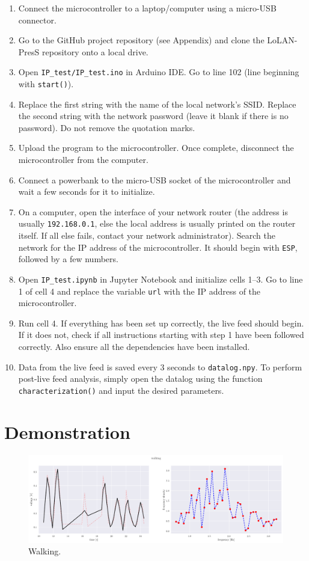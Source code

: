 \documentclass[12pt,a4paper,twoside]{article}
\begin{document}
\begin{enumerate}
    \item Connect the microcontroller to a laptop/computer using a micro-USB connector.
    \item Go to the GitHub project repository (see Appendix) and clone the LoLAN-PresS repository onto a local drive.
    \item Open \texttt{IP\_test/IP\_test.ino} in Arduino IDE. Go to line 102 (line beginning with \texttt{start()}).
    \item Replace the first string with the name of the local network's SSID. Replace the second string with the network password (leave it blank if there is no password). Do not remove the quotation marks.
    \item Upload the program to the microcontroller. Once complete, disconnect the microcontroller from the computer.
    \item Connect a powerbank to the micro-USB socket of the microcontroller and wait a few seconds for it to initialize.
    \item On a computer, open the interface of your network router (the address is usually \texttt{192.168.0.1}, else the local address is usually printed on the router itself. If all else fails, contact your network administrator). Search the network for the IP address of the microcontroller. It should begin with \texttt{ESP}, followed by a few numbers.
    \item Open \texttt{IP\_test.ipynb} in Jupyter Notebook and initialize cells 1--3. Go to line 1 of cell 4 and replace the variable \texttt{url} with the IP address of the microcontroller.
    \item Run cell 4. If everything has been set up correctly, the live feed should begin. If it does not, check if all instructions starting with step 1 have been followed correctly. Also ensure all the dependencies have been installed.
    \item Data from the live feed is saved every 3 seconds to \texttt{datalog.npy}. To perform post-live feed analysis, simply open the datalog using the function \texttt{characterization()} and input the desired parameters.
\end{enumerate}

\section{Demonstration}

\begin{figure}[h!]
	\centering
	\includegraphics[width=\linewidth]{walking.png}
	\caption{Walking.}
	\label{fig:walking}
\end{figure}
\end{document}

